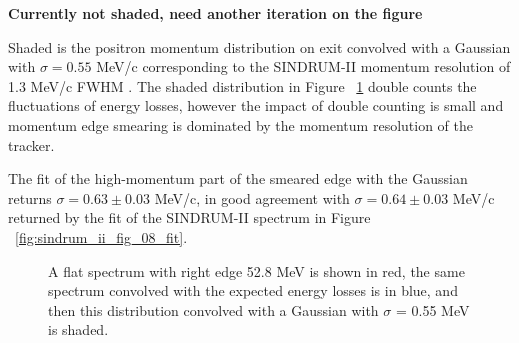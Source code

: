 {\bf Currently not shaded, need another iteration on the figure}

Shaded is the positron momentum distribution on exit convolved with
a Gaussian with $\sigma = 0.55$ MeV/c corresponding to the SINDRUM-II
momentum resolution of 1.3 MeV/c FWHM \cite{sindrum_ii:Kaulard1997_Thesis}.
The shaded distribution in Figure ~\ref{fig:sindrum_ii_michel_calibration}
double counts the fluctuations of energy losses, however the impact of double
counting is small and momentum edge smearing is dominated by the momentum
resolution of the tracker.

The fit of the high-momentum part of the smeared edge with the Gaussian returns
$\sigma = 0.63 \pm 0.03$ MeV/c, in good agreement with $\sigma = 0.64 \pm 0.03$ MeV/c
returned by the fit of the SINDRUM-II spectrum in Figure ~\ref{fig:sindrum_ii_fig_08_fit}.

\begin{figure} 
\caption{
  \label{fig:sindrum_ii_michel_calibration}
  A flat spectrum with right edge 52.8 MeV is shown in red, the same spectrum convolved with 
  the expected energy losses is in blue, and then this distribution convolved with
  a Gaussian with $\sigma$ = 0.55 MeV is shaded.
}
\end{figure}


